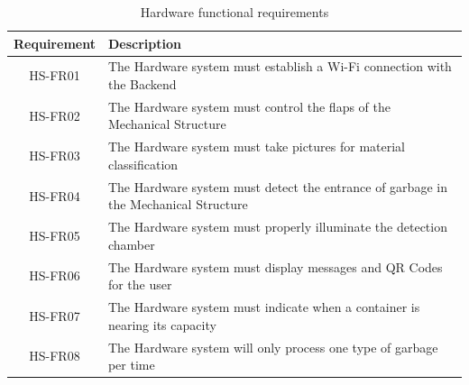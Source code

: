 \documentclass[a4paper,11pt]{article}
\begin{document}
\begin{table}[H]
  \caption{\small{Hardware functional requirements}}
  \begin{center}
    \begin{tabular}{|c|p{95mm}|}
      \hline
      Requirement & Description                                                                         \\ \hline
      HS-FR01     & The Hardware system must establish a Wi-Fi connection with the Backend              \\ \hline
      HS-FR02     & The Hardware system must control the flaps of the Mechanical Structure              \\ \hline
      HS-FR03     & The Hardware system must take pictures for material classification                  \\ \hline
      HS-FR04     & The Hardware system must detect the entrance of garbage in the Mechanical Structure \\ \hline
      HS-FR05     & The Hardware system must properly illuminate the detection chamber                  \\ \hline
      HS-FR06     & The Hardware system must display messages and QR Codes for the user                 \\ \hline
      HS-FR07     & The Hardware system must indicate when a container is nearing its capacity          \\ \hline
      HS-FR08     & The Hardware system will only process one type of garbage per time                  \\ \hline
    \end{tabular}
  \end{center}
  \label{tab:hardware0}
\end{table}
\end{document}
